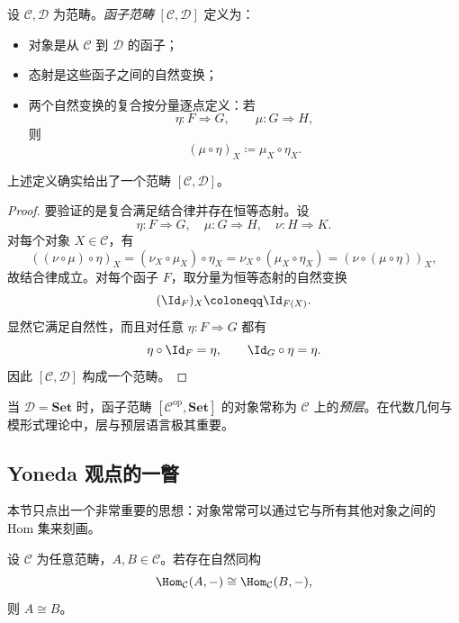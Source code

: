 \begin{definition}
设 $\mathcal C,\mathcal D$ 为范畴。\emph{函子范畴} $[\mathcal C,\mathcal D]$ 定义为：
\begin{itemize}[leftmargin=2em]
  \item 对象是从 $\mathcal C$ 到 $\mathcal D$ 的函子；
  \item 态射是这些函子之间的自然变换；
  \item 两个自然变换的复合按分量逐点定义：若
  \[
    \eta\colon F\Rightarrow G,
    \qquad
    \mu\colon G\Rightarrow H,
  \]
  则
  \[
    (\mu\circ \eta)_X \coloneqq \mu_X\circ \eta_X.
  \]
\end{itemize}
\end{definition}

\begin{proposition}
上述定义确实给出了一个范畴 $[\mathcal C,\mathcal D]$。
\end{proposition}

\begin{proof}
要验证的是复合满足结合律并存在恒等态射。设
\[
  \eta\colon F\Rightarrow G,
  \quad
  \mu\colon G\Rightarrow H,
  \quad
  \nu\colon H\Rightarrow K.
\]
对每个对象 $X\in \mathcal C$，有
\[
  ((\nu\circ \mu)\circ \eta)_X
  = (\nu_X\circ \mu_X)\circ \eta_X
  = \nu_X\circ (\mu_X\circ \eta_X)
  = (\nu\circ (\mu\circ \eta))_X,
\]
故结合律成立。对每个函子 $F$，取分量为恒等态射的自然变换
\[
  (\Id_F)_X\coloneqq \Id_{F(X)}.
\]
显然它满足自然性，而且对任意 $\eta\colon F\Rightarrow G$ 都有
\[
  \eta\circ \Id_F = \eta,
  \qquad
  \Id_G\circ \eta = \eta.
\]
因此 $[\mathcal C,\mathcal D]$ 构成一个范畴。
\end{proof}

\begin{remark}
当 $\mathcal D=\mathbf{Set}$ 时，函子范畴 $[\mathcal C^{\mathrm{op}},\mathbf{Set}]$ 的对象常称为 $\mathcal C$ 上的\emph{预层}。在代数几何与模形式理论中，层与预层语言极其重要。
\end{remark}

\subsection{Yoneda 观点的一瞥}

本节只点出一个非常重要的思想：对象常常可以通过它与所有其他对象之间的 Hom 集来刻画。

\begin{proposition}
设 $\mathcal C$ 为任意范畴，$A,B\in \mathcal C$。若存在自然同构
\[
  \Hom_{\mathcal C}(A,-)\cong \Hom_{\mathcal C}(B,-),
\]
则 $A\cong B$。
\end{proposition}

